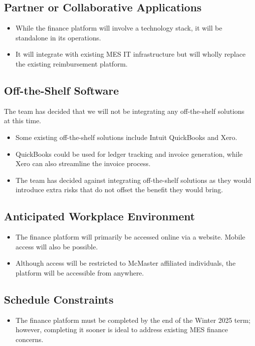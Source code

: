 \documentclass[12pt]{article}
\begin{document}
\subsection{Partner or Collaborative Applications}
\begin{itemize}
    \item While the finance platform will involve a technology stack, it will be standalone in its operations.
    \item It will integrate with existing MES IT infrastructure but will wholly replace the existing reimbursement platform.
\end{itemize}
 

\subsection{Off-the-Shelf Software}
The team has decided that we will not be integrating any off-the-shelf solutions at this time.

\begin{itemize}
    \item Some existing off-the-shelf solutions include Intuit QuickBooks and Xero.
    \item QuickBooks could be used for ledger tracking and invoice generation, while Xero can also streamline the invoice process.
    \item The team has decided against integrating off-the-shelf solutions as they would introduce extra risks that do not offset the benefit they would bring. 
\end{itemize}
 
\subsection{Anticipated Workplace Environment}
\begin{itemize}
    \item The finance platform will primarily be accessed online via a website. Mobile access will also be possible. 
    \item Although access will be restricted to McMaster affiliated individuals, the platform will be accessible from anywhere.
\end{itemize}
 

\subsection{Schedule Constraints}
\begin{itemize}
    \item The finance platform must be completed by the end of the Winter 2025 term; however, completing it sooner is ideal to address existing MES finance concerns.
\end{itemize}
\end{document}
